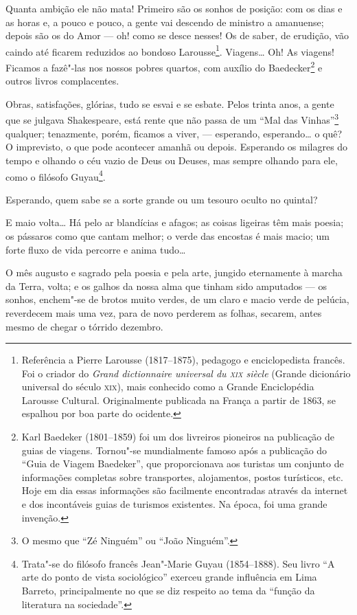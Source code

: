 Quanta ambição ele não mata! Primeiro são os sonhos de posição: com os
dias e as horas e, a pouco e pouco, a gente vai descendo de ministro a
amanuense; depois são os do Amor --- oh! como se desce nesses! Os de
saber, de erudição, vão caindo até ficarem reduzidos ao bondoso
Larousse\footnote{Referência a Pierre Larousse (1817--1875), pedagogo
  e enciclopedista francês. Foi o criador do \emph{Grand dictionnaire
  universal du \textsc{xix} siècle} (Grande dicionário universal do século \textsc{xix}),
  mais conhecido como a Grande Enciclopédia Larousse Cultural.
  Originalmente publicada na França a partir de 1863, se espalhou por
  boa parte do ocidente.}. Viagens\ldots{} Oh! As viagens! Ficamos a
fazê"-las nos nossos pobres quartos, com auxílio do Baedecker\footnote{Karl
  Baedeker (1801--1859) foi um dos livreiros pioneiros na publicação
  de guias de viagens. Tornou"-se mundialmente famoso após a publicação
  do ``Guia de Viagem Baedeker'', que proporcionava aos turistas um
  conjunto de informações completas sobre transportes, alojamentos,
  postos turísticos, etc. Hoje em dia essas informações são facilmente
  encontradas através da internet e dos incontáveis guias de turismos
  existentes. Na época, foi uma grande invenção.} e outros livros
complacentes.

Obras, satisfações, glórias, tudo se esvai e se esbate. Pelos trinta
anos, a gente que se julgava Shakespeare, está rente que não passa de um
``Mal das Vinhas''\footnote{O mesmo que ``Zé Ninguém'' ou ``João
  Ninguém''.} qualquer; tenazmente, porém, ficamos a viver, ---
esperando, esperando\ldots{} o quê? O imprevisto, o que pode acontecer
amanhã ou depois. Esperando os milagres do tempo e olhando o céu vazio
de Deus ou Deuses, mas sempre olhando para ele, como o filósofo
Guyau\footnote{Trata"-se do filósofo francês Jean"-Marie Guyau (1854--1888). Seu livro ``A arte do ponto de vista sociológico'' exerceu \label{guyau}
  grande influência em Lima Barreto, principalmente no que se diz
  respeito ao tema da ``função da literatura na sociedade''.}.

Esperando, quem sabe se a sorte grande ou um tesouro oculto no quintal?

E maio volta\ldots{} Há pelo ar blandícias e afagos; as coisas ligeiras
têm mais poesia; os pássaros como que cantam melhor; o verde das
encostas é mais macio; um forte fluxo de vida percorre e anima
tudo\ldots{}

O mês augusto e sagrado pela poesia e pela arte, jungido eternamente à
marcha da Terra, volta; e os galhos da nossa alma que tinham sido
amputados --- os sonhos, enchem"-se de brotos muito verdes, de um claro e
macio verde de pelúcia, reverdecem mais uma vez, para de novo perderem
as folhas, secarem, antes mesmo de chegar o tórrido dezembro.

